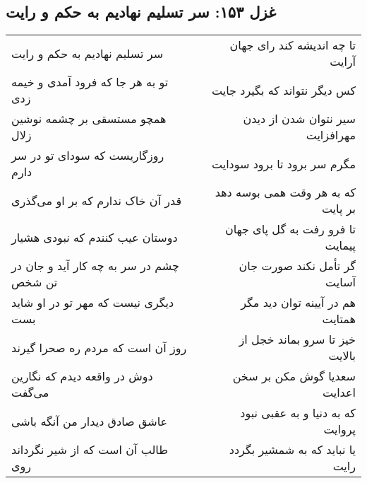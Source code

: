 \begin{center}
\section*{غزل ۱۵۳: سر تسلیم نهادیم به حکم و رایت}
\label{sec:153}
\begin{longtable}{l p{0.5cm} r}
سر تسلیم نهادیم به حکم و رایت
&&
تا چه اندیشه کند رای جهان آرایت
\\
تو به هر جا که فرود آمدی و خیمه زدی
&&
کس دیگر نتواند که بگیرد جایت
\\
همچو مستسقی بر چشمه نوشین زلال
&&
سیر نتوان شدن از دیدن مهرافزایت
\\
روزگاریست که سودای تو در سر دارم
&&
مگرم سر برود تا برود سودایت
\\
قدر آن خاک ندارم که بر او می‌گذری
&&
که به هر وقت همی بوسه دهد بر پایت
\\
دوستان عیب کنندم که نبودی هشیار
&&
تا فرو رفت به گل پای جهان پیمایت
\\
چشم در سر به چه کار آید و جان در تن شخص
&&
گر تأمل نکند صورت جان آسایت
\\
دیگری نیست که مهر تو در او شاید بست
&&
هم در آیینه توان دید مگر همتایت
\\
روز آن است که مردم ره صحرا گیرند
&&
خیز تا سرو بماند خجل از بالایت
\\
دوش در واقعه دیدم که نگارین می‌گفت
&&
سعدیا گوش مکن بر سخن اعدایت
\\
عاشق صادق دیدار من آنگه باشی
&&
که به دنیا و به عقبی نبود پروایت
\\
طالب آن است که از شیر نگرداند روی
&&
یا نباید که به شمشیر بگردد رایت
\\
\end{longtable}
\end{center}
